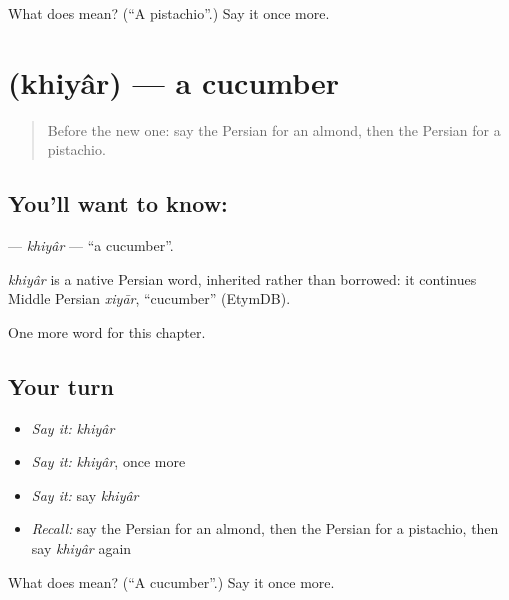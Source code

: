 \begin{tcolorbox}[breakable,colback=teal!4,colframe=teal!35!black,title={Before you move on}]
What does  mean? (\textquotedblleft{}A pistachio\textquotedblright{}.) Say it once more.
\end{tcolorbox}
\section[\texorpdfstring{\fa{خیار} (khiyâr)}{خیار (khiyâr)}]{ (khiyâr) — a cucumber}

\label{lesson:FA-C101-khiyar}



\begin{quote}
Before the new one: say the Persian for an almond, then the Persian for a pistachio.
\end{quote}

\subsection*{You'll want to know: }
\textbf{} — \emph{khiyâr} — \textquotedblleft{}a cucumber\textquotedblright{}.

\begin{cousinweb}
\emph{khiyâr} is a native Persian word, inherited rather than borrowed: it continues Middle Persian \emph{xiyār}, \textquotedblleft{}cucumber\textquotedblright{} (EtymDB).
\end{cousinweb}

\begin{grammarlens}[title={What you've built}]
One more word for this chapter.
\end{grammarlens}

\subsection*{Your turn}
\begin{itemize}
\raggedright
  \item \emph{Say it:} \emph{khiyâr}
  \item \emph{Say it:} \emph{khiyâr}, once more
  \item \emph{Say it:} say \emph{khiyâr}
  \item \emph{Recall:} say the Persian for an almond, then the Persian for a pistachio, then say \emph{khiyâr} again
\end{itemize}

\begin{tcolorbox}[breakable,colback=teal!4,colframe=teal!35!black,title={Before you move on}]
What does  mean? (\textquotedblleft{}A cucumber\textquotedblright{}.) Say it once more.
\end{tcolorbox}
